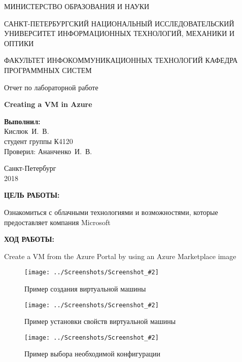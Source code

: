 \documentclass[14pt,a4paper]{extreport}
\newcommand{\screenshot}[2]{\begin{figure}[ht]%
\centering\texttt{[image: ../Screenshots/Screenshot\_\#2]}%
\caption{#1}%
\label{picture#2}%
\end{figure}%
}
\newcommand{\header}[1]{%
{
\fontsize{16pt}{14pt}\selectfont
\begin{center}
\textbf{\MakeUppercase{#1}:}
\end{center}
}
}
\newcommand{\prepod}{Ананченко~И.~В.}
\newcommand{\igork}{Кислюк~И.~В.}
\begin{document}
	\begin{titlepage}
	\begin{center}	
		\fontsize{14pt}{14pt}\selectfont
		МИНИСТЕРСТВО ОБРАЗОВАНИЯ И НАУКИ\\

		\vspace*{0.6\baselineskip}
		
		САНКТ-ПЕТЕРБУРГСКИЙ НАЦИОНАЛЬНЫЙ ИССЛЕДОВАТЕЛЬСКИЙ УНИВЕРСИТЕТ ИНФОРМАЦИОННЫХ ТЕХНОЛОГИЙ, МЕХАНИКИ И ОПТИКИ
		
		\vspace*{0.6\baselineskip}
		ФАКУЛЬТЕТ ИНФОКОММУНИКАЦИОННЫХ ТЕХНОЛОГИЙ
		КАФЕДРА ПРОГРАММНЫХ СИСТЕМ
	
		\vspace*{7\baselineskip}
		\fontsize{19pt}{18pt}\selectfont
		Отчет по лабораторной работе
		
		\fontsize{20pt}{18pt}\selectfont
		\textbf{Creating a VM in Azure}\\
		\vspace*{1.15\baselineskip}
		\end{center}
	
	\vspace*{2\baselineskip}
	\begin{flushright}
	\fontsize{14pt}{14pt}\selectfont
	\textbf{Выполнил:}\\
	\igork\\
	студент группы К4120\\
	Проверил: \prepod\\
	\end{flushright}
	
	\vspace{\fill}
	\begin{center}
	Санкт-Петербург\\
	2018
	\end{center}
	
\end{titlepage}

\newpage

\header{Цель работы}

\fontsize{14pt}{14pt}\selectfont

Ознакомиться с облачными технологиями и возможностями, которые предоставляет компания Microsoft
\clearpage

\header{Ход работы}

Create a VM from the Azure Portal by using an Azure Marketplace image
\screenshot{Пример создания виртуальной машины}{1}
\screenshot{Пример установки свойств виртуальной машины}{2}
\screenshot{Пример выбора необходимой конфигурации}{3}
\end{document}

